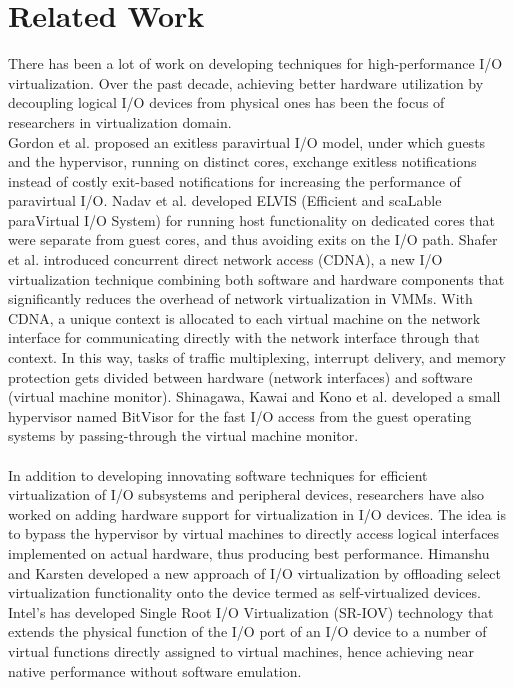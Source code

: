 \section{Related Work\label{sec:prework}}
There has been a lot of work on developing techniques for high-performance I/O virtualization. Over the past decade, achieving better hardware utilization by decoupling logical I/O devices from physical ones has been the focus of researchers in virtualization domain.
\\
Gordon et al. \cite{exitless} proposed an exitless paravirtual I/O model, under which guests and the hypervisor, running on distinct cores, exchange exitless notifications instead of costly exit-based notifications for increasing the performance of paravirtual I/O. Nadav et al. \cite{efficient}  developed ELVIS (Efficient and scaLable paraVirtual I/O System) for running host functionality on dedicated cores that were separate from guest cores, and thus avoiding exits on the I/O path. Shafer et al. \cite{CDNA} introduced concurrent direct network access (CDNA), a new I/O virtualization technique combining both software and hardware components that significantly reduces the overhead of network virtualization in VMMs. With CDNA, a unique context is allocated to each virtual machine on the network interface for communicating directly with the network interface through that context. In this way, tasks of traffic multiplexing, interrupt delivery, and memory protection gets divided between hardware (network interfaces) and software (virtual  machine monitor). Shinagawa, Kawai and Kono et al. \cite{bitvisor} developed a small hypervisor named BitVisor for the fast I/O access from the guest operating systems by passing-through the virtual machine monitor.
\\
\\
In addition to developing innovating software techniques for efficient virtualization of I/O subsystems and peripheral devices, researchers have also worked on adding hardware support for virtualization in I/O devices. The idea is to bypass the hypervisor by virtual machines to directly access logical interfaces implemented on actual hardware, thus producing best performance. Himanshu and Karsten \cite{selfvirt} developed a new approach of I/O virtualization by offloading select virtualization functionality onto the device termed as self-virtualized devices. Intel's has developed Single Root I/O Virtualization (SR-IOV) technology \cite{SRIOV} that extends the physical function of the I/O port of an I/O device to a number of virtual functions directly assigned to virtual machines, hence achieving near native performance without software emulation. 
